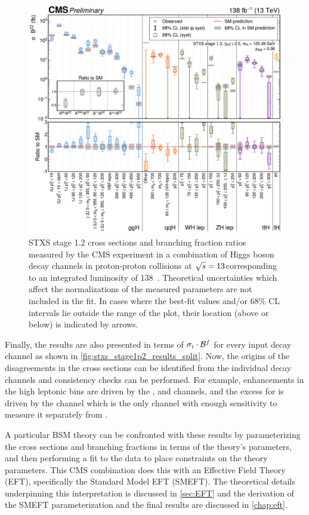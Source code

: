 \begin{figure}
  \centering
  \includegraphics[width=\textwidth]{Figures/Theory/Higgs/HIG-21-018-Figure_006.pdf}
  \caption[Measurements of the Stage 1.2 STXS]{STXS stage 1.2 cross sections and branching fraction ratios measured by the CMS experiment in a combination of Higgs boson decay channels in proton-proton collisions at $\sqrt{s}=13$\TeV corresponding to an integrated luminosity of 138\fbinv~\cite{CMS-PAS-HIG-21-018}. Theoretical uncertainties which affect the normalizations of the measured parameters are not included in the fit. In cases where the best-fit values and/or 68\% CL intervals lie outside the range of the plot, their location (above or below) is indicated by arrows.}\label{fig:stxs_stage1p2_results}
\end{figure}

Finally, the results are also presented in terms of $\sigma_i \cdot \mathcal{B}^f$ for every input decay channel as shown in \cref{fig:stxs_stage1p2_results_split}. Now, the origins of the disagreements in the cross sections can be identified from the individual decay channels and consistency checks can be performed. For example, enhancements in the high \ptV \WH leptonic bins are driven by the \Hbb, \HWW and \Htautau channels, and the excess for \tH is driven by the \Hgg channel which is the only channel with enough sensitivity to measure it separately from \ttH. 

A particular BSM theory can be confronted with these results by parameterizing the cross sections and branching fractions in terms of the theory's parameters, and then performing a fit to the data to place constraints on the theory parameters. This CMS combination does this with an Effective Field Theory (EFT), specifically the Standard Model EFT (SMEFT). The theoretical details underpinning this interpretation is discussed in \cref{sec:EFT} and the derivation of the SMEFT parameterization and the final results are discussed in \cref{chap:eft}.

